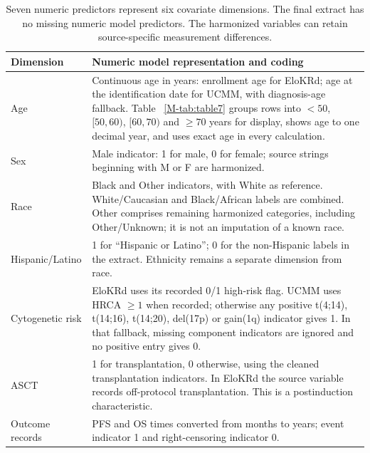 \documentclass[11pt]{article}
\theoremstyle{remark}\newtheorem{remark}{Remark}[section]
\providecommand{\DIFaddtex}[1]{{\protect\color{blue} \sf #1}} %
\providecommand{\DIFaddFL}[1]{\DIFadd{#1}} %
\providecommand{\DIFaddbeginFL}{} %
\providecommand{\DIFaddendFL}{} %
\providecommand{\DIFadd}[1]{\texorpdfstring{\DIFaddtex{#1}}{#1}} %
\begin{document}
\begin{table}[htbp]
\centering\small
\caption{Harmonized model variables in the myeloma application.}\label{tab:S9}
\begin{tabular}{p{1.3in}p{4.6in}}
\toprule
Dimension & Numeric model representation and coding\\\midrule
Age & Continuous age in years: enrollment age for EloKRd; age at the identification date for UCMM, with diagnosis-age fallback. Table \DIFaddbeginFL \DIFaddFL{~\ref{M-tab:table7} }\DIFaddendFL groups rows into $<50$, $[50,60)$, $[60,70)$ and $\geq70$ years for display, shows age to one decimal year, and uses exact age in every calculation.\\
Sex & Male indicator: 1 for male, 0 for female; source strings beginning with M or F are harmonized.\\
Race & Black and Other indicators, with White as reference. White/Caucasian and Black/African labels are combined. Other comprises remaining harmonized categories, including Other/Unknown; it is not an imputation of a known race.\\
Hispanic/Latino & 1 for ``Hispanic or Latino''; 0 for the non-Hispanic labels in the extract. Ethnicity remains a separate dimension from race.\\
Cytogenetic risk & EloKRd uses its recorded 0/1 high-risk flag. UCMM uses HRCA $\geq1$ when recorded; otherwise any positive t(4;14), t(14;16), t(14;20), del(17p) or gain(1q) indicator gives 1. In that fallback, missing component indicators are ignored and no positive entry gives 0.\\
ASCT & 1 for transplantation, 0 otherwise, using the cleaned transplantation indicators. In EloKRd the source variable records off-protocol transplantation. This is a postinduction characteristic.\\
Outcome records & PFS and OS times converted from months to years; event indicator 1 and right-censoring indicator 0.\\
\bottomrule
\end{tabular}
\caption*{Seven numeric predictors represent six covariate dimensions. The final extract has no missing numeric model predictors. The harmonized variables can retain source-specific measurement differences.}
\end{table}
\end{document}
